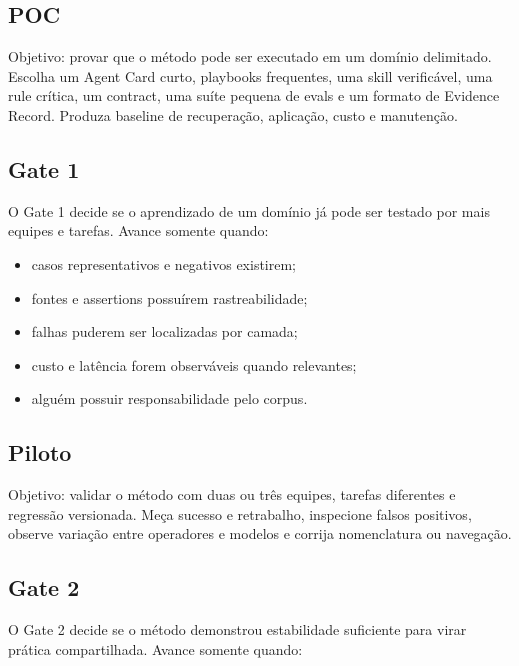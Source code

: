 \documentclass[
  10pt,
  a4paper,
  oneside]{book}
\providecommand{\tightlist}{%
  \setlength{\itemsep}{0pt}\setlength{\parskip}{0pt}}
\begin{document}
\hypertarget{poc}{%
\subsection{POC}\label{poc}}

Objetivo: provar que o método pode ser executado em um domínio
delimitado. Escolha um Agent Card curto, playbooks frequentes, uma skill
verificável, uma rule crítica, um contract, uma suíte pequena de evals e
um formato de Evidence Record. Produza baseline de recuperação,
aplicação, custo e manutenção.

\hypertarget{gate-1}{%
\subsection{Gate 1}\label{gate-1}}

O Gate 1 decide se o aprendizado de um domínio já pode ser testado por
mais equipes e tarefas. Avance somente quando:

\begin{itemize}
\tightlist
\item
  casos representativos e negativos existirem;
\item
  fontes e assertions possuírem rastreabilidade;
\item
  falhas puderem ser localizadas por camada;
\item
  custo e latência forem observáveis quando relevantes;
\item
  alguém possuir responsabilidade pelo corpus.
\end{itemize}

\hypertarget{piloto}{%
\subsection{Piloto}\label{piloto}}

Objetivo: validar o método com duas ou três equipes, tarefas diferentes
e regressão versionada. Meça sucesso e retrabalho, inspecione falsos
positivos, observe variação entre operadores e modelos e corrija
nomenclatura ou navegação.

\hypertarget{gate-2}{%
\subsection{Gate 2}\label{gate-2}}

O Gate 2 decide se o método demonstrou estabilidade suficiente para
virar prática compartilhada. Avance somente quando:
\end{document}
